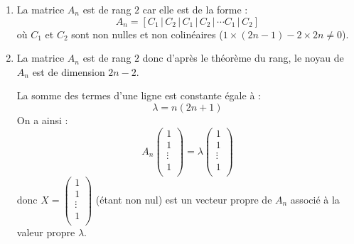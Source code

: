 \documentclass[a4paper,10pt]{report}
\begin{document}
\begin{enumerate}
\item La matrice $A_n$ est de rang $2$ car elle est de la forme :
$$A_n =[C_1 \, \vert \, C_2 \, \vert \, C_1 \, \vert \, C_2 \, \vert \, \cdots C_1 \, \vert \, C_2]$$
où $C_1$ et $C_2$ sont non nulles et non colinéaires ($1 \times (2n-1)-2\times 2n \neq 0$).
\item La matrice $A_n$ est de rang $2$ donc d'après le théorème du rang, le noyau de $A_n$ est de dimension $2n-2$. 

\medskip

\noindent La somme des termes d'une ligne est constante égale à :
$$ \lambda = n(2n+1)$$
On a ainsi :
$$ A_n \begin{pmatrix}
1 \\
1 \\
\vdots \\
1 \\
\end{pmatrix} = \lambda \begin{pmatrix}
1 \\
1 \\
\vdots \\
1 \\
\end{pmatrix}$$
donc $X = \begin{pmatrix}
1 \\
1 \\
\vdots \\
1 \\
\end{pmatrix}$ (étant non nul) est un vecteur propre de $A_n$ associé à la valeur propre $\lambda$.

\medskip


\end{enumerate}
\end{document}
